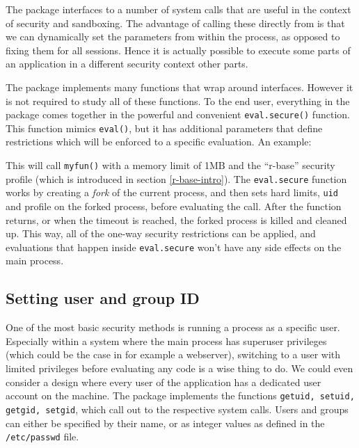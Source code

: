 The \RAppArmor package interfaces to a number of \Linux system calls that are
useful in the context of security and sandboxing. The advantage of calling
these directly from \R is that we can dynamically set the parameters from
within the \R process, as opposed to fixing them for all \R sessions. Hence it
is actually possible to execute some parts of an application in a different
security context other parts.

The package implements many functions that wrap around \Linux {}
interfaces. However it is not required to study all of these functions. To the
end user, everything in the package comes together in the powerful and
convenient \texttt{eval.secure()} function. This function mimics
\texttt{eval()}, but it has additional parameters that define restrictions
which will be enforced to a specific evaluation. An example:

\begin{knitrout}\mycodesize
{}\color{fgcolor}\begin{kframe}
\begin{alltt}
 \hlkwb{<-} \hlstd{(}\hlstd{(),}  \hlstd{=}  \hlopt{*} \hlstd{,}  \hlstd{=} \hlstd{)}
\end{alltt}
\end{kframe}
\end{knitrout}


This will call \texttt{myfun()} with a memory limit of 1MB and the ``r-base''
security profile (which is introduced in section \ref{r-base-intro}). The
\texttt{eval.secure} function works by creating a \emph{fork} of the current
process, and then sets hard limits, \texttt{uid} and \AppArmor profile on the
forked process, before evaluating the call. After the function returns, or when
the timeout is reached, the forked process is killed and cleaned up. This way,
all of the one-way security restrictions can be applied, and evaluations that
happen inside \texttt{eval.secure} won't have any side effects on the main
process.

\subsection{Setting user and group ID}

One of the most basic security methods is running a process as a specific user.
Especially within a system where the main process has superuser privileges
(which could be the case in for example a webserver), switching to a user with
limited privileges before evaluating any code is a wise thing to do. We could
even consider a design where every user of the application has a dedicated
user account on the \Linux machine. The \RAppArmor package implements the
functions \texttt{getuid, setuid, getgid, setgid}, which call out to the
respective \Linux system calls. Users and groups can either be specified
by their name, or as integer values as defined in the \texttt{/etc/passwd} file.

